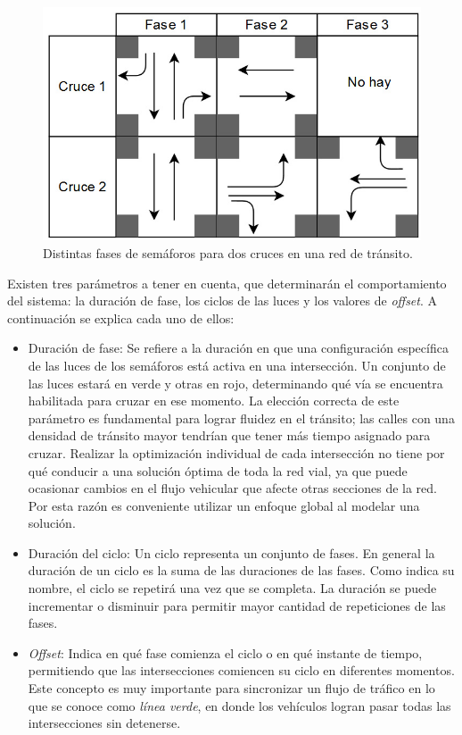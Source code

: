 \begin{figure}
	\centering
	\includegraphics[width=0.8\linewidth]{Figures/fases1}
	\caption{Distintas fases de semáforos para dos cruces en una red de tránsito.}
	\label{fig:fases}
\end{figure}

Existen tres parámetros a tener en cuenta, que determinarán el comportamiento del sistema: la duración de fase, los ciclos de las luces y los valores de \emph{offset}. 
A continuación se explica cada uno de ellos:


\begin{itemize}
 	\item Duración de fase: Se refiere a la duración en que una configuración específica de las luces de los semáforos está activa en una intersección. Un conjunto de las luces estará en verde y otras en rojo, determinando qué vía se encuentra habilitada para cruzar en ese momento. La elección correcta de este parámetro es fundamental para lograr fluidez en el tránsito; las calles con una densidad de tránsito mayor tendrían que tener más tiempo asignado para cruzar. Realizar la optimización individual de cada intersección no tiene por qué conducir a una solución óptima de toda la red vial, ya que puede ocasionar cambios en el flujo vehicular que afecte otras secciones de la red. Por esta razón es conveniente utilizar un enfoque global al modelar una solución.
 	
 	\item Duración del ciclo: Un ciclo representa un conjunto de fases. En general la duración de un ciclo es la suma de las duraciones de las fases. Como indica su nombre, el ciclo se repetirá una vez que se completa. La duración se puede incrementar o disminuir para permitir mayor cantidad de repeticiones de las fases.
 	
 	\item \emph{Offset}: Indica en qué fase comienza el ciclo o en qué instante de tiempo, permitiendo que las intersecciones comiencen su ciclo en diferentes momentos. Este concepto es muy importante para sincronizar un flujo de tráfico en lo que se conoce como \emph{línea verde}, en donde los vehículos logran pasar todas las intersecciones sin detenerse.
\end{itemize}

